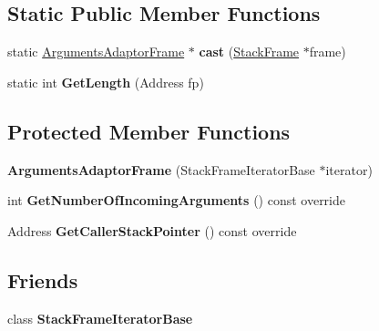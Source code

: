 \subsection*{Static Public Member Functions}
\begin{DoxyCompactItemize}
\item 
static \hyperlink{classv8_1_1internal_1_1_arguments_adaptor_frame}{Arguments\+Adaptor\+Frame} $\ast$ {\bfseries cast} (\hyperlink{classv8_1_1_stack_frame}{Stack\+Frame} $\ast$frame)\hypertarget{classv8_1_1internal_1_1_arguments_adaptor_frame_a6b8283fe3991c88663621fdf586b67ca}{}\label{classv8_1_1internal_1_1_arguments_adaptor_frame_a6b8283fe3991c88663621fdf586b67ca}

\item 
static int {\bfseries Get\+Length} (Address fp)\hypertarget{classv8_1_1internal_1_1_arguments_adaptor_frame_a51d99c9b090136f304bcabda96e04ec8}{}\label{classv8_1_1internal_1_1_arguments_adaptor_frame_a51d99c9b090136f304bcabda96e04ec8}

\end{DoxyCompactItemize}
\subsection*{Protected Member Functions}
\begin{DoxyCompactItemize}
\item 
{\bfseries Arguments\+Adaptor\+Frame} (Stack\+Frame\+Iterator\+Base $\ast$iterator)\hypertarget{classv8_1_1internal_1_1_arguments_adaptor_frame_ac2681526413000e2f5879bc2c0b0fd2f}{}\label{classv8_1_1internal_1_1_arguments_adaptor_frame_ac2681526413000e2f5879bc2c0b0fd2f}

\item 
int {\bfseries Get\+Number\+Of\+Incoming\+Arguments} () const  override\hypertarget{classv8_1_1internal_1_1_arguments_adaptor_frame_a9addd6367930c8183ce0e8cc89b76f16}{}\label{classv8_1_1internal_1_1_arguments_adaptor_frame_a9addd6367930c8183ce0e8cc89b76f16}

\item 
Address {\bfseries Get\+Caller\+Stack\+Pointer} () const  override\hypertarget{classv8_1_1internal_1_1_arguments_adaptor_frame_a6bc23d016faea1e6dfe9d328efd119b1}{}\label{classv8_1_1internal_1_1_arguments_adaptor_frame_a6bc23d016faea1e6dfe9d328efd119b1}

\end{DoxyCompactItemize}
\subsection*{Friends}
\begin{DoxyCompactItemize}
\item 
class {\bfseries Stack\+Frame\+Iterator\+Base}\hypertarget{classv8_1_1internal_1_1_arguments_adaptor_frame_ac7310421866976ca454bbe11c5f926c3}{}\label{classv8_1_1internal_1_1_arguments_adaptor_frame_ac7310421866976ca454bbe11c5f926c3}

\end{DoxyCompactItemize}
